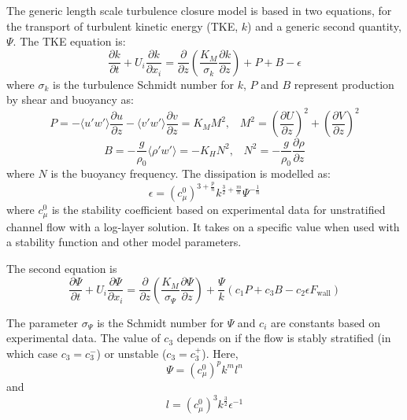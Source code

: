 The generic length scale turbulence closure model \citep{umlauf2003} is based in two equations, 
for the transport of turbulent kinetic energy (TKE, $k$) and a generic second quantity, $\Psi$. The TKE equation is:
\begin{equation}
\frac{\partial k}{\partial t} + U_i\frac{\partial k}{\partial x_i} = \frac{\partial}{\partial z}\left(\frac{K_M}{\sigma_k}\frac{\partial k}{\partial z}\right) + P + B - \epsilon 
\label{tke_one}
\end{equation}
where $\sigma_k$ is the turbulence Schmidt number for $k$, $P$ and $B$ represent production by shear and buoyancy as:
\begin{equation}
P=-\langle u'w'\rangle\frac{\partial u}{\partial z}-\langle v'w' \rangle\frac{\partial v}{\partial z}=K_MM^2, \;\;\; M^2=\left(\frac{\partial U}{\partial z}\right)^2 + \left(\frac{\partial V}{\partial z}\right)^2 
\end{equation}
\begin{equation}
B=-\frac{g}{\rho_0}\langle\rho'w'\rangle=-K_HN^2, \;\;\; N^2= -\frac{g}{\rho_0}\frac{\partial\rho}{\partial z}
\end{equation}
where $N$ is the buoyancy frequency. The dissipation is modelled as:
\begin{equation}
\epsilon=\left(c_\mu^0\right)^{3+\frac{p}{n}}k^{\frac{3}{2}+\frac{m}{n}}\Psi^{-\frac{1}{n}}
\end{equation}
where $c_\mu^0$ is the stability coefficient based on experimental data for unstratified channel flow with a
log-layer solution. It takes on a specific value when used with a stability function and other model
parameters.

The second equation is 
\begin{equation}
\frac{\partial \Psi}{\partial t} + U_i\frac{\partial \Psi}{\partial x_i} = \frac{\partial}{\partial z}\left(\frac{K_M}{\sigma_\Psi}\frac{\partial \Psi}{\partial z}\right) + \frac{\Psi}{k}(c_1P + c_3B - c_2\epsilon F_{\mathrm{wall}})
\label{psi_one}
\end{equation}

The parameter $\sigma_\Psi$ is the Schmidt number for $\Psi$ and $c_i$ are constants based on experimental data. The value of $c_3$ depends on if the flow is stably stratified (in which case $c_3=c_3^-$) or unstable ($c_3=c_3^+$). Here,
\begin{equation}
\Psi=\left(c_\mu^0\right)^pk^ml^n
\end{equation}
and
\begin{equation}
l=\left(c_\mu^0\right)^3k^{\frac{3}{2}}\epsilon^{-1}
\end{equation}


